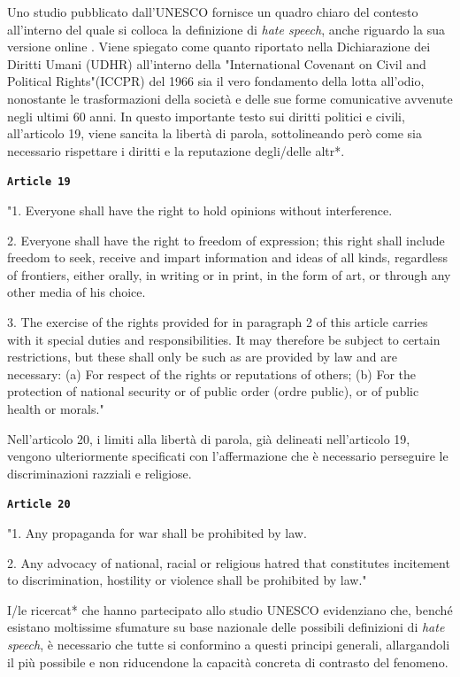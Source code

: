 Uno studio pubblicato dall'UNESCO fornisce un quadro chiaro del contesto all’interno del quale si colloca la definizione di \textit{hate speech}, anche riguardo la sua versione online \citep{unesco2015}. Viene spiegato come quanto riportato nella Dichiarazione dei Diritti Umani (UDHR) all'interno della "International Covenant on Civil and Political Rights"(ICCPR) del 1966 \citep{iccpr1996} sia il vero fondamento della lotta all'odio, nonostante le trasformazioni della società e delle sue forme comunicative avvenute negli ultimi 60 anni.
In questo importante testo sui diritti politici e civili, all'articolo 19, viene sancita la libertà di parola, sottolineando però come sia necessario rispettare i diritti e la reputazione degli/delle altr*.
\begin{displayquote}
	\texttt{\textbf{Article 19}}
	
	"1. Everyone shall have the right to hold opinions without interference.
	
	2. Everyone shall have the right to freedom of expression; this right shall include freedom to seek, receive and impart information and ideas of all kinds, regardless of frontiers, either orally, in writing or in print, in the form of art, or through any other media of his choice.
	
	3. The exercise of the rights provided for in paragraph 2 of this article carries with it special duties and responsibilities. It may therefore be subject to certain restrictions, but these shall only be such as are provided by law and are necessary:
	(a) For respect of the rights or reputations of others;
	(b) For the protection of national security or of public order (ordre public), or of public health or morals."
\end{displayquote}
Nell'articolo 20, i limiti alla libertà di parola, già delineati nell’articolo 19, vengono ulteriormente specificati con l’affermazione che è necessario perseguire le discriminazioni razziali e religiose.
\begin{displayquote}
	\texttt{\textbf{Article 20}}
	
	"1. Any propaganda for war shall be prohibited by law.
	
	2. Any advocacy of national, racial or religious hatred that constitutes incitement to discrimination, hostility or violence shall be prohibited by law."
\end{displayquote}

I/le ricercat* che hanno partecipato allo studio UNESCO evidenziano che, benché esistano moltissime sfumature su base nazionale delle possibili definizioni di \textit{hate speech}, è necessario che tutte si conformino a questi principi generali, allargandoli il più possibile e non riducendone la capacità concreta di contrasto del fenomeno.

